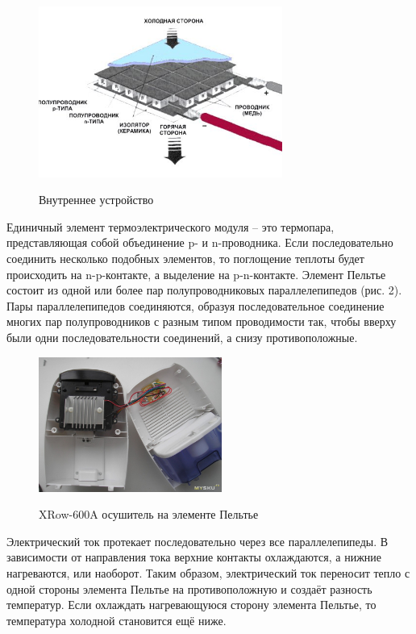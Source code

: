 \documentclass[a4paper,12pt]{article} %
\begin{document}
\begin{figure}
\includegraphics[width=8cm]{pictures/Cooler-Peltier-03.jpg}
\label{fig:image}
\caption{Внутреннее устройство}
\end{figure}

Единичный элемент термоэлектрического модуля – это термопара, представляющая собой объединение p- и n-проводника. Если последовательно соединить несколько подобных элементов, то поглощение теплоты будет происходить на n-p-контакте, а выделение на p-n-контакте. Элемент Пельтье состоит из одной или более пар полупроводниковых параллелепипедов (рис. 2). Пары параллелепипедов соединяются, образуя последовательное соединение многих пар полупроводников с разным типом проводимости так, чтобы вверху были одни последовательности соединений, а снизу противоположные. 

\begin{figure}
\includegraphics[width=6cm]{pictures/dry.jpg}
\label{fig:image}
\caption{XRow-600A осушитель на элементе Пельтье}
\end{figure}
Электрический ток протекает последовательно через все параллелепипеды. В зависимости от направления тока верхние контакты охлаждаются, а нижние нагреваются, или наоборот. Таким образом, электрический ток переносит тепло с одной стороны элемента Пельтье на противоположную и создаёт разность температур. Если охлаждать нагревающуюся сторону элемента Пельтье, то температура холодной становится ещё ниже.
\end{document}
